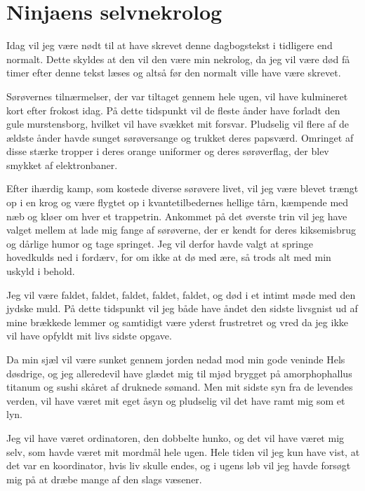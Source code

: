 \begin{minipage}[t]{150mm}
\vspace{3mm}
\section*{Ninjaens selvnekrolog}
Idag vil jeg være nødt til at have skrevet denne dagbogstekst i tidligere end normalt. Dette skyldes at den vil den være min nekrolog, da jeg vil være død få timer efter denne tekst læses og altså før den normalt ville  have være skrevet.

Sørøvernes tilnærmelser, der var tiltaget gennem hele ugen, vil have kulmineret kort efter frokost idag. På dette tidspunkt vil de fleste ånder have forladt den gule murstensborg, hvilket vil have svækket mit forsvar. Pludselig vil flere af de ældste ånder havde sunget sørøversange og trukket deres papsværd. Omringet af disse stærke tropper i deres orange uniformer og deres sørøverflag, der blev smykket af elektronbaner. 

Efter ihærdig kamp, som kostede diverse sørøvere livet, vil jeg være blevet trængt op i en krog og være flygtet op i kvantetilbedernes hellige tårn, kæmpende med næb og kløer om hver et trappetrin. Ankommet på det øverste trin vil jeg have valget mellem at lade mig fange af sørøverne, der er kendt for deres kiksemisbrug og dårlige humor og tage springet. Jeg vil derfor havde valgt at springe hovedkulds ned i fordærv, for om ikke at dø med ære, så trods alt med min uskyld i behold.

Jeg vil være faldet, faldet, faldet, faldet, faldet, og død i et intimt møde med den jydske 
muld. På dette tidspunkt vil jeg både have åndet den sidste livsgnist ud af mine brækkede lemmer og samtidigt være yderst frustretret og vred da jeg ikke vil have opfyldt mit livs sidste opgave. 

Da min sjæl vil være sunket gennem jorden nedad mod min gode veninde Hels døsdrige, og jeg alleredevil have  glædet mig til mjød brygget på amorphophallus titanum og sushi skåret af druknede sømand. Men mit sidste syn fra de levendes verden, vil have været mit eget åsyn og pludselig vil det have ramt mig som et lyn.

Jeg vil have været ordinatoren, den dobbelte hunko, og det vil have været mig selv, som havde været mit mordmål hele ugen. Hele tiden vil jeg kun have vist, at det var en koordinator, hvis liv skulle endes, og i ugens løb vil jeg havde forsøgt mig på at dræbe mange af den slags væsener.


\end{minipage}
